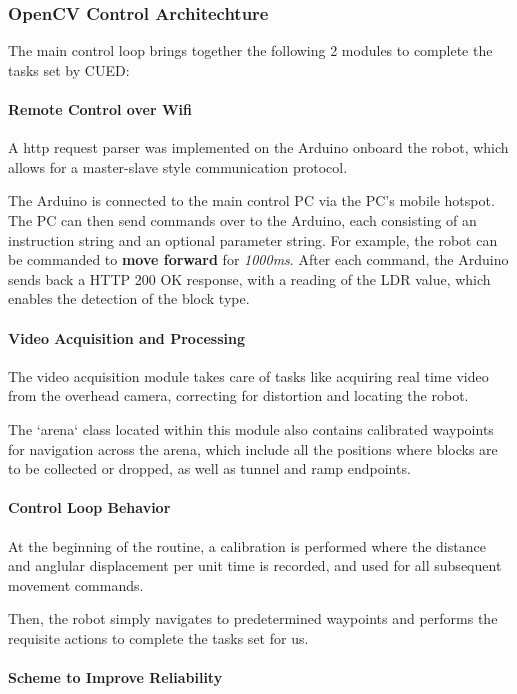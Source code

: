 \documentclass{article}
\begin{document}
\subsubsection{OpenCV Control Architechture}
The main control loop brings together the following 2 modules to complete the tasks set by CUED:

\paragraph{Remote Control over Wifi}

A http request parser was implemented on the Arduino onboard the robot, which allows for a master-slave style communication protocol. 

The Arduino is connected to the main control PC via the PC's mobile hotspot. The PC can then send commands over to the Arduino, each consisting of an instruction string and an optional parameter string. For example, the robot can be commanded to \textbf{move forward} for \textit{1000ms}. After each command, the Arduino sends back a HTTP 200 OK response, with a reading of the LDR value, which enables the detection of the block type.

\paragraph{Video Acquisition and Processing}
The video acquisition module takes care of tasks like acquiring real time video from the overhead camera, correcting for distortion and locating the robot.

The `arena` class located within this module also contains calibrated waypoints for navigation across the arena, which include all the positions where blocks are to be collected or dropped, as well as tunnel and ramp endpoints.

\paragraph{Control Loop Behavior}
At the beginning of the routine, a calibration is performed where the distance and anglular displacement per unit time is recorded, and used for all subsequent movement commands.

Then, the robot simply navigates to predetermined waypoints and performs the requisite actions to complete the tasks set for us.

\paragraph{Scheme to Improve Reliability}
\end{document}
